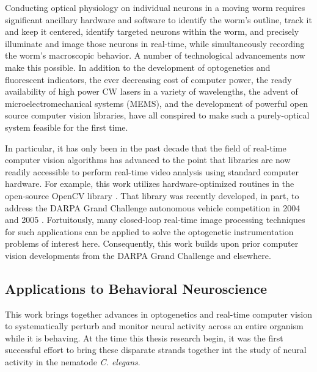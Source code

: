 Conducting optical physiology on individual neurons in a moving worm requires significant ancillary hardware and software to identify the worm's outline, track it and keep it centered, identify targeted neurons within the worm, and precisely illuminate and image those neurons in real-time, while simultaneously recording the worm's macroscopic behavior. 
A number of technological advancements now make this possible. In addition to the development of optogenetics and fluorescent indicators, the ever decreasing cost of computer power, the ready availability of high power CW lasers in a variety of wavelengths,  the advent of microelectromechanical systems (MEMS), and the development of powerful open source computer vision libraries, have  all conspired to make such a purely-optical system feasible for the first time. 

In particular, it has only been in the past decade that the field of real-time computer vision algorithms has advanced to the point that libraries are now readily accessible to  perform real-time video analysis using standard computer hardware. For example, this work utilizes hardware-optimized routines in the open-source OpenCV library \citep{bradski_opencv_2000,bradski_learning_2008}. That library was recently developed, in part, to address the DARPA Grand Challenge autonomous vehicle competition in 2004 and 2005  \citep{stavens_learning_2011,buehler_stanley:_2007}. Fortuitously, many closed-loop real-time image processing
techniques for such applications can be applied to solve the optogenetic instrumentation problems of interest here. Consequently, this work builds upon prior computer vision developments from the DARPA Grand Challenge and elsewhere.



\subsection{Applications to Behavioral Neuroscience}


This work brings together advances in optogenetics and real-time computer vision to systematically perturb and monitor neural activity across an entire organism while it is behaving.  At the time this thesis research begin, it was the first successful effort to bring these disparate strands together int the study of neural activity in the nematode \textit{C. elegans}.

